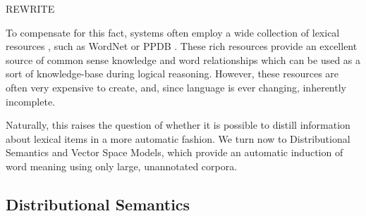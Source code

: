 \documentclass[12pt]{article}
\begin{document}
REWRITE

To compensate for this fact, systems often employ a wide collection of lexical
resources \cite{maccartney:2008:coling,bjerva:2014:semeval,beltagy:2016:cl},
such as WordNet \cite{miller:1995:acm} or PPDB \cite{ganitkevitch:2013:naacl}.
These rich resources provide an excellent source of common sense knowledge
and word relationships which can be used as a sort of knowledge-base during
logical reasoning. However, these resources are often very expensive to create,
and, since language is ever changing, inherently incomplete.

Naturally, this raises the question of whether it is possible to distill
information about lexical items in a more automatic fashion. We turn now to
Distributional Semantics and Vector Space Models, which provide an automatic
induction of word meaning using only large, unannotated corpora.

\subsection{Distributional Semantics}
\label{sec:dist}
\end{document}

